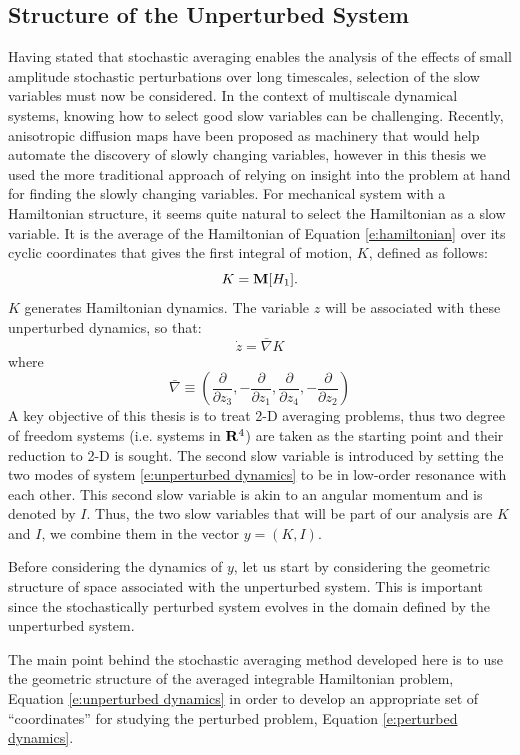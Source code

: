 \subsection{Structure of the Unperturbed System}

Having stated that stochastic averaging enables the analysis of the effects of small amplitude stochastic perturbations over long timescales, selection of the slow variables must now be considered. In the context of multiscale dynamical systems, knowing how to select good slow variables can be challenging. Recently, anisotropic diffusion maps \citep{singer09:_detec} have been proposed as machinery that would help automate the discovery of slowly changing variables, however in this thesis we used the more traditional approach of relying on insight into the problem at hand for finding the slowly changing variables. For mechanical system with a Hamiltonian structure, it seems quite natural to select the Hamiltonian as a slow variable. It is the average of the Hamiltonian of Equation \eqref{e:hamiltonian} over its cyclic coordinates that gives the first integral of motion, $K$, defined as follows:
\[
K = \operatorname{\mathbf M}[H_1].
\]
$K$ generates Hamiltonian dynamics. The variable $z$ will be associated with these unperturbed dynamics, so that:
\begin{equation}
\label{e:unperturbed dynamics}
\dot z = \bar \nabla K
\end{equation}
where
\[
\bar \nabla \equiv \left(\frac{\partial}{\partial z_3}, -\frac{\partial}{\partial z_1}, \frac{\partial}{\partial z_4}, -\frac{\partial}{\partial z_2}\right)
\]
A key objective of this thesis is to treat 2-D averaging problems, thus two degree of freedom systems (i.e. systems in $\mathbf R^4$) are taken as the starting point and their reduction to 2-D is sought. The second slow variable is introduced by setting the two modes of system \eqref{e:unperturbed dynamics} to be in low-order resonance with each other. This second slow variable is akin to an angular momentum and is denoted by $I$. Thus, the two slow variables that will be part of our analysis are $K$ and $I$, we combine them in the vector $y = (K,I)$.

Before considering the dynamics of $y$, let us start by considering the geometric structure of space associated with the unperturbed system. This is important since the stochastically perturbed system evolves in the domain defined by the unperturbed system.

The main point behind the stochastic averaging method developed here is to use the geometric structure of the averaged integrable Hamiltonian problem, Equation \eqref{e:unperturbed dynamics} in order to develop an appropriate set of ``coordinates'' for studying the perturbed problem, Equation \eqref{e:perturbed dynamics}.

